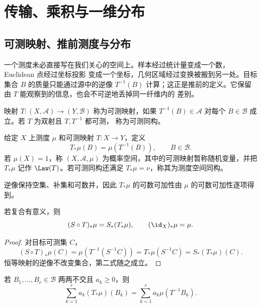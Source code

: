 \section{传输、乘积与一维分布}\label{sec:02-03}

\subsection{可测映射、推前测度与分布}\label{subsec:2-3-1}

一个测度未必直接写在我们关心的空间上。样本经过统计量变成一个数，Euclidean 点经过坐标投影
变成一个坐标，几何区域经过变换被搬到另一处。目标集合 $B$ 的质量只能通过源中的逆像
$T^{-1}(B)$ 计算；这正是推前的定义。它保留由 $T$ 能观察到的信息，也会不可逆地丢掉同一纤维内的
差别。

\begin{definition}[可测映射]\label{def:2-3-1-1}
映射 $T:(X,\mathcal A)\to(Y,\mathcal B)$ 称为可测映射，如果
$T^{-1}(B)\in\mathcal A$ 对每个 $B\in\mathcal B$ 成立。若 $T$ 为双射且 $T,T^{-1}$ 都可测，
称为可测同构。
\end{definition}

\begin{definition}[推前测度]\label{def:2-3-1-2}
给定 $X$ 上测度 $\mu$ 和可测映射 $T:X\to Y$，定义
\[
 T_*\mu(B)=\mu(T^{-1}(B)),\qquad B\in\mathcal B.
\]
若 $\mu(X)=1$，称 $(X,\mathcal A,\mu)$ 为概率空间，其中的可测映射暂称随机变量，并把
$T_*\mu$ 记作 $\Law(T)$。若可测同构还满足 $T_*\mu=\nu$，称其为测度空间同构。
\end{definition}

逆像保持空集、补集和可数并，因此 $T_*\mu$ 的可数可加性由 $\mu$ 的可数可加性逐项得到。

\begin{proposition}[函子性]\label{proposition:2-3-1-1}
若复合有意义，则
\[
 (S\circ T)_*\mu=S_*(T_*\mu),\qquad (\id_X)_*\mu=\mu.
\]
\end{proposition}

\begin{proof}
对目标可测集 $C$，
\[
 (S\circ T)_*\mu(C)
 =\mu(T^{-1}(S^{-1}C))
 =T_*\mu(S^{-1}C)=S_*(T_*\mu)(C).
\]
恒等映射的逆像不改变集合，第二式随之成立。
\end{proof}

\begin{proposition}[有限简单测试公式]\label{proposition:2-3-1-1a}
若 $B_1,\dots,B_r\in\mathcal B$ 两两不交且 $a_k\ge0$，则
\[
 \sum_{k=1}^ra_k(T_*\mu)(B_k)
 =\sum_{k=1}^ra_k\mu(T^{-1}B_k).
\]
\end{proposition}


